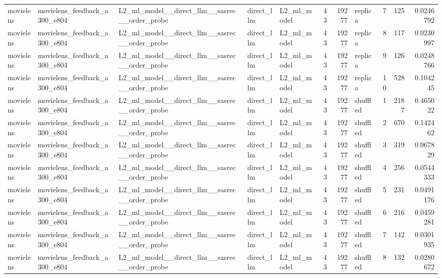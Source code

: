 \begin{table}[htbp!]
\begin{tabular}{lllllrrlrrr}
movielens & movielens\_feedback\_a300\_e804 & L2\_ml\_model\_\_direct\_llm\_\_sasrec\_\_order\_probe & direct\_llm & L2\_ml\_model & 43 & 19277 & replica & 7 & 125 & 0.0246792 \\
movielens & movielens\_feedback\_a300\_e804 & L2\_ml\_model\_\_direct\_llm\_\_sasrec\_\_order\_probe & direct\_llm & L2\_ml\_model & 43 & 19277 & replica & 8 & 117 & 0.0230997 \\
movielens & movielens\_feedback\_a300\_e804 & L2\_ml\_model\_\_direct\_llm\_\_sasrec\_\_order\_probe & direct\_llm & L2\_ml\_model & 43 & 19277 & replica & 9 & 126 & 0.0248766 \\
movielens & movielens\_feedback\_a300\_e804 & L2\_ml\_model\_\_direct\_llm\_\_sasrec\_\_order\_probe & direct\_llm & L2\_ml\_model & 43 & 19277 & replica & 10 & 528 & 0.104245 \\
movielens & movielens\_feedback\_a300\_e804 & L2\_ml\_model\_\_direct\_llm\_\_sasrec\_\_order\_probe & direct\_llm & L2\_ml\_model & 43 & 19277 & shuffled & 1 & 2187 & 0.465022 \\
movielens & movielens\_feedback\_a300\_e804 & L2\_ml\_model\_\_direct\_llm\_\_sasrec\_\_order\_probe & direct\_llm & L2\_ml\_model & 43 & 19277 & shuffled & 2 & 670 & 0.142462 \\
movielens & movielens\_feedback\_a300\_e804 & L2\_ml\_model\_\_direct\_llm\_\_sasrec\_\_order\_probe & direct\_llm & L2\_ml\_model & 43 & 19277 & shuffled & 3 & 319 & 0.067829 \\
movielens & movielens\_feedback\_a300\_e804 & L2\_ml\_model\_\_direct\_llm\_\_sasrec\_\_order\_probe & direct\_llm & L2\_ml\_model & 43 & 19277 & shuffled & 4 & 256 & 0.0544333 \\
movielens & movielens\_feedback\_a300\_e804 & L2\_ml\_model\_\_direct\_llm\_\_sasrec\_\_order\_probe & direct\_llm & L2\_ml\_model & 43 & 19277 & shuffled & 5 & 231 & 0.0491176 \\
movielens & movielens\_feedback\_a300\_e804 & L2\_ml\_model\_\_direct\_llm\_\_sasrec\_\_order\_probe & direct\_llm & L2\_ml\_model & 43 & 19277 & shuffled & 6 & 216 & 0.0459281 \\
movielens & movielens\_feedback\_a300\_e804 & L2\_ml\_model\_\_direct\_llm\_\_sasrec\_\_order\_probe & direct\_llm & L2\_ml\_model & 43 & 19277 & shuffled & 7 & 142 & 0.0301935 \\
movielens & movielens\_feedback\_a300\_e804 & L2\_ml\_model\_\_direct\_llm\_\_sasrec\_\_order\_probe & direct\_llm & L2\_ml\_model & 43 & 19277 & shuffled & 8 & 132 & 0.0280672 \\

\end{tabular}
\end{table}

